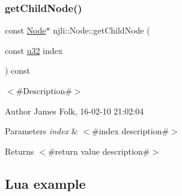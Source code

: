 \begin{DoxyCodeInclude}
\end{DoxyCodeInclude}
\mbox{\label{classnjli_1_1_node_afb42f32385d6413ffca69072bf3381a9}} 
\subsubsection{\texorpdfstring{get\+Child\+Node()}{getChildNode()}\hspace{0.1cm}{\footnotesize\ttfamily [2/2]}}
{\footnotesize\ttfamily const \mbox{\hyperlink{classnjli_1_1_node}{Node}}$\ast$ njli\+::\+Node\+::get\+Child\+Node (\begin{DoxyParamCaption}\item[{const \mbox{\hyperlink{_util_8h_a10e94b422ef0c20dcdec20d31a1f5049}{u32}}}]{index }\end{DoxyParamCaption}) const}



$<$\#\+Description\#$>$ 

\begin{DoxyAuthor}{Author}
James Folk, 16-\/02-\/10 21\+:02\+:04
\end{DoxyAuthor}

\begin{DoxyParams}{Parameters}
{\em index} & $<$\#index description\#$>$\\
\hline
\end{DoxyParams}
\begin{DoxyReturn}{Returns}
$<$\#return value description\#$>$
\end{DoxyReturn}
\hypertarget{classnjli_1_1_steering_behavior_wander_ex1}{}\subsection{Lua example}\label{classnjli_1_1_steering_behavior_wander_ex1}

\begin{DoxyCodeInclude}
\end{DoxyCodeInclude}
\mbox{\label{classnjli_1_1_node_a6c77a7d8e6c4bc04c990d9d8db12cf4d}} 

